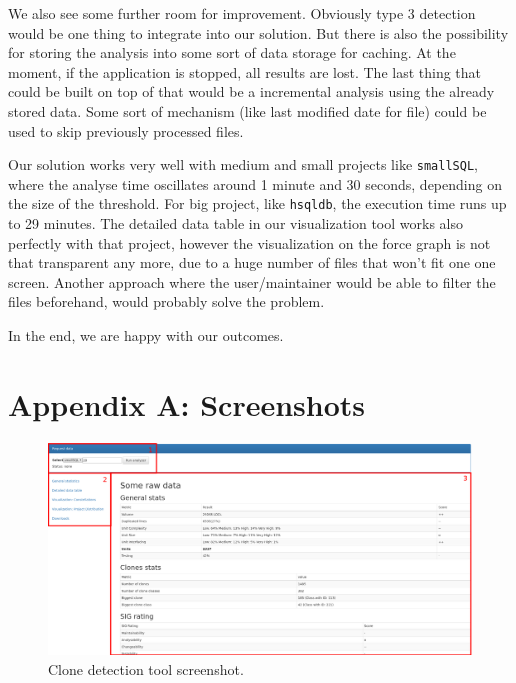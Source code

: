 \documentclass{uva-inf-article}
\begin{document}
We also see some further room for improvement. Obviously type 3 detection would be one thing to integrate into our solution. But there is also the possibility for storing the analysis into some sort of data storage for caching. At the moment, if the application is stopped, all results are lost. The last thing that could be built on top of that would be a incremental analysis using the already stored data. Some sort of mechanism (like last modified date for file) could be used to skip previously processed files.

Our solution works very well with medium and small projects like \texttt{smallSQL}, where the analyse time oscillates around 1 minute and 30 seconds, depending on the size of the threshold. For big project, like \texttt{hsqldb}, the execution time runs up to 29 minutes. The detailed data table in our visualization tool works also perfectly with that project, however the visualization on the force graph is not that transparent any more, due to a huge number of files that won't fit one one screen. Another approach where the user/maintainer would be able to filter the files beforehand, would probably solve the problem. 

In the end, we are happy with our outcomes. 


\printbibliography


\pagebreak[4]

\section{Appendix A: Screenshots}\label{appendix:a}

\begin{figure}[!htb]
	\includegraphics[width=\textwidth]{visualization1}
	\centering
	\caption{Clone detection tool screenshot.}
	\label{screenshot1}
\end{figure}
\end{document}
